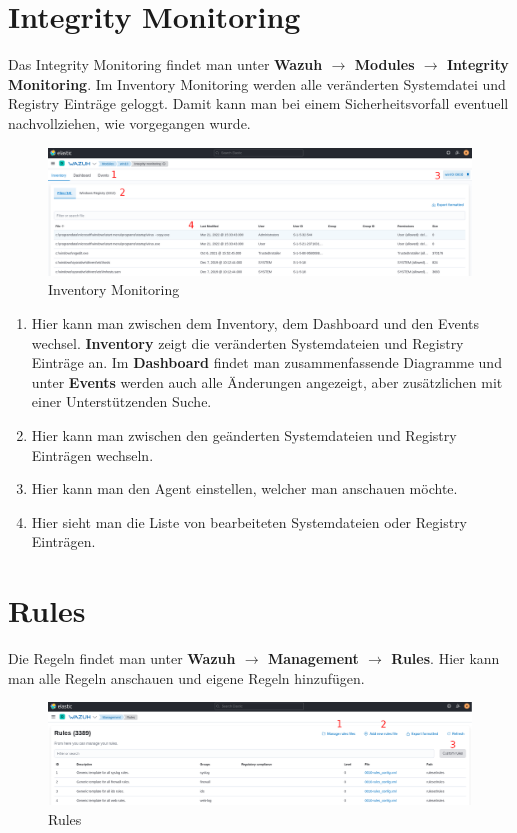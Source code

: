 \section{Integrity Monitoring}
Das Integrity Monitoring findet man unter \textbf{Wazuh $\rightarrow$ Modules $\rightarrow$ Integrity Monitoring}.
Im Inventory Monitoring werden alle veränderten Systemdatei und Registry Einträge geloggt. 
Damit kann man bei einem Sicherheitsvorfall eventuell nachvollziehen, wie vorgegangen wurde.

\begin{figure}[H]
    \centering
    \includegraphics[width=\linewidth]{../img/wazuh-im-inventory.png}
    \caption{Inventory Monitoring}
\end{figure}

\begin{enumerate}
    \item Hier kann man zwischen dem Inventory, dem Dashboard und den Events wechsel.
    \textbf{Inventory} zeigt die veränderten Systemdateien und Registry Einträge an. Im \textbf{Dashboard} findet man zusammenfassende Diagramme und unter \textbf{Events} werden auch alle Änderungen angezeigt, aber zusätzlichen mit einer Unterstützenden Suche. 
    \item Hier kann man zwischen den geänderten Systemdateien und Registry Einträgen wechseln.
    \item Hier kann man den Agent einstellen, welcher man anschauen möchte.
    \item Hier sieht man die Liste von bearbeiteten Systemdateien oder Registry Einträgen.
\end{enumerate}

\section{Rules}
Die Regeln findet man unter \textbf{Wazuh $\rightarrow$ Management $\rightarrow$ Rules}.
Hier kann man alle Regeln anschauen und eigene Regeln hinzufügen. 

\begin{figure}[H]
    \centering
    \includegraphics[width=\linewidth]{../img/wazuh-rules.png}
    \caption{Rules}
\end{figure}

